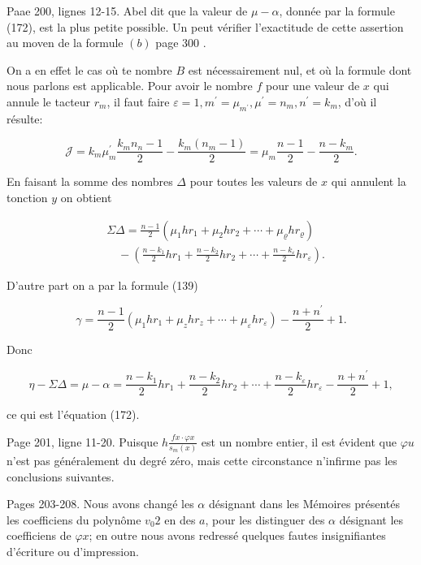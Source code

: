 \documentclass{article}
\begin{document}
Paae 200, lignes 12-15. Abel dit que la valeur de \(\mu-\alpha\), donnée par la formule (172), est la plus petite possible. Un peut vérifier l'exactitude de cette assertion au moven de la formule \((b)\) page 300 .

On a en effet le cas où te nombre \(B\) est nécessairement nul, et où la formule dont nous parlons est applicable. Pour avoir le nombre \(f\) pour une valeur de \(x\) qui annule le tacteur \(r_{m}\), il faut faire \(\varepsilon=1, m^{\prime}=\mu_{m^{\prime}}, \mu^{\prime}=n_{m}, n^{\prime}=k_{m}\), d'où il résulte:

\[
\mathcal{J}=k_{m} \mu_{m}^{\prime} \frac{k_{m} n_{n}-1}{2}-\frac{k_{m}\left(n_{m}-1\right)}{2}=\mu_{m} \frac{n-1}{2}-\frac{n-k_{m}}{2} .
\]

En faisant la somme des nombres \(\Delta\) pour toutes les valeurs de \(x\) qui annulent la tonction \(y\) on obtient

\[
\begin{aligned}
& \Sigma \Delta=\frac{n-1}{2}\left(\mu_{1} h r_{1}+\mu_{2} h r_{2}+\cdots+\mu_{\varrho} h r_{\varrho}\right) \\
& \quad-\left(\frac{n-k_{1}}{2} h r_{1}+\frac{n-k_{2}}{2} h r_{2}+\cdots+\frac{n-k_{\varepsilon}}{2} h r_{\varepsilon}\right) .
\end{aligned}
\]

D'autre part on a par la formule (139)

\[
\gamma=\frac{n-1}{2}\left(\mu_{1} h r_{1}+\mu_{z} h r_{z}+\cdots+\mu_{\varepsilon} h r_{\varepsilon}\right)-\frac{n+n^{\prime}}{2}+1 .
\]

Donc

\[
\eta-\Sigma \Delta=\mu-\alpha=\frac{n-k_{1}}{2} h r_{1}+\frac{n-k_{2}}{2} h r_{2}+\cdots+\frac{n-k_{\varepsilon}}{2} h r_{\varepsilon}-\frac{n+n^{\prime}}{2}+1,
\]

ce qui est l'équation (172).

Page 201, ligne 11-20. Puisque \(h \frac{f x \cdot \varphi x}{s_{m}(x)}\) est un nombre entier, il est évident que \(\varphi u\) n'est pas généralement du degré zéro, mais cette circonstance n'infirme pas les conclusions suivantes.

Pages 203-208. Nous avons changé les \(\alpha\) désignant dans les Mémoires présentés les coefficiens du polynôme \(v_{0} 2\) en des \(a\), pour les distinguer des \(\alpha\) désignant les coefficiens de \(\varphi x\); en outre nous avons redressé quelques fautes insignifiantes d'écriture ou d'impression.
\end{document}
